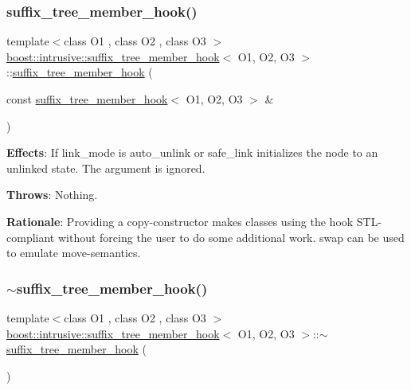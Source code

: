 \subsubsection{\texorpdfstring{suffix\+\_\+tree\+\_\+member\+\_\+hook()}{suffix\_tree\_member\_hook()}\hspace{0.1cm}{\footnotesize\ttfamily [2/2]}}
{\footnotesize\ttfamily template$<$class O1 , class O2 , class O3 $>$ \\
\hyperlink{classboost_1_1intrusive_1_1suffix__tree__member__hook}{boost\+::intrusive\+::suffix\+\_\+tree\+\_\+member\+\_\+hook}$<$ O1, O2, O3 $>$\+::\hyperlink{classboost_1_1intrusive_1_1suffix__tree__member__hook}{suffix\+\_\+tree\+\_\+member\+\_\+hook} (\begin{DoxyParamCaption}\item[{const \hyperlink{classboost_1_1intrusive_1_1suffix__tree__member__hook}{suffix\+\_\+tree\+\_\+member\+\_\+hook}$<$ O1, O2, O3 $>$ \&}]{ }\end{DoxyParamCaption})}

{\bfseries Effects}\+: If link\+\_\+mode is {\ttfamily auto\+\_\+unlink} or {\ttfamily safe\+\_\+link} initializes the node to an unlinked state. The argument is ignored.

{\bfseries Throws}\+: Nothing.

{\bfseries Rationale}\+: Providing a copy-\/constructor makes classes using the hook S\+T\+L-\/compliant without forcing the user to do some additional work. {\ttfamily swap} can be used to emulate move-\/semantics. \mbox{\label{classboost_1_1intrusive_1_1suffix__tree__member__hook_a573fac96e555f2a28b3b01e24c445e3b}} 
\subsubsection{\texorpdfstring{$\sim$suffix\+\_\+tree\+\_\+member\+\_\+hook()}{~suffix\_tree\_member\_hook()}}
{\footnotesize\ttfamily template$<$class O1 , class O2 , class O3 $>$ \\
\hyperlink{classboost_1_1intrusive_1_1suffix__tree__member__hook}{boost\+::intrusive\+::suffix\+\_\+tree\+\_\+member\+\_\+hook}$<$ O1, O2, O3 $>$\+::$\sim$\hyperlink{classboost_1_1intrusive_1_1suffix__tree__member__hook}{suffix\+\_\+tree\+\_\+member\+\_\+hook} (\begin{DoxyParamCaption}{ }\end{DoxyParamCaption})}

